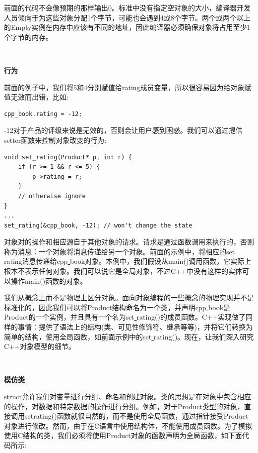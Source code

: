 前面的代码不会像预期的那样输出0。标准中没有指定空对象的大小，编译器开发人员倾向于为这些对象分配1个字节，可能也会遇到4或8个字节。两个或两个以上的Empty实例在内存中应该有不同的地址，因此编译器必须确保对象将占用至少1个字节的内存。 \par

\noindent\textbf{}\ \par
\textbf{行为} \ \par
前面的例子中，我们将5和4分别赋值给rating成员变量，所以很容易因为给对象赋值无效而出错，比如:\par

\begin{lstlisting}[caption={}]
cpp_book.rating = -12;
\end{lstlisting}

-12对于产品的评级来说是无效的，否则会让用户感到困惑。我们可以通过提供setter函数来控制对象改变的行为: \par

\begin{lstlisting}[caption={}]
void set_rating(Product* p, int r) {
	if (r >= 1 && r <= 5) {
		p->rating = r;
	}
	// otherwise ignore
}
...
set_rating(&cpp_book, -12); // won't change the state
\end{lstlisting}

对象对的操作和相应源自于其他对象的请求。请求是通过函数调用来执行的，否则称为消息：一个对象将消息传递给另一个对象。前面的示例中，将相应的set\underline{ }rating消息传递给cpp\underline{ }book对象。本例中，我们假设从main()调用函数，它实际上根本不表示任何对象。我们可以说它是全局对象，不过C++中没有这样的实体可以操作main()函数的对象。 \par
我们从概念上而不是物理上区分对象。面向对象编程的一些概念的物理实现并不是标准化的，因此我们可以将Product结构命名为一个类，并声明cpp\underline{ }book是Product的一个实例，并且具有一个名为set\underline{ }rating()的成员函数。C++实现做了同样的事情：提供了语法上的结构(类、可见性修饰符、继承等等)，并将它们转换为简单的结构，使用全局函数，如前面示例中的set\underline{ }rating()。现在，让我们深入研究C++对象模型的细节。 \par

\noindent\textbf{}\ \par
\textbf{模仿类} \ \par
struct允许我们对变量进行分组、命名和创建对象。类的思想是在对象中包含相应的操作，对数据和特定数据的操作进行分组。例如，对于Product类型的对象，直接调用set\underline{}rating()函数就很自然的，而不是使用全局函数，通过指针接受Product对象进行修改。然而，由于在C语言中使用结构体，不能使用成员函数。为了模拟使用C结构的类，我们必须将使用Product对象的函数声明为全局函数，如下面代码所示:\par

